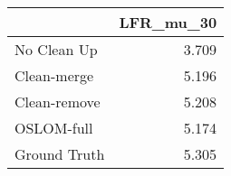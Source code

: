 \begin{tabular}{lr}
\toprule
{} & LFR_mu_30 \\
\midrule
No Clean Up  &     3.709 \\
Clean-merge  &     5.196 \\
Clean-remove &     5.208 \\
OSLOM-full   &     5.174 \\
Ground Truth &     5.305 \\
\bottomrule
\end{tabular}

